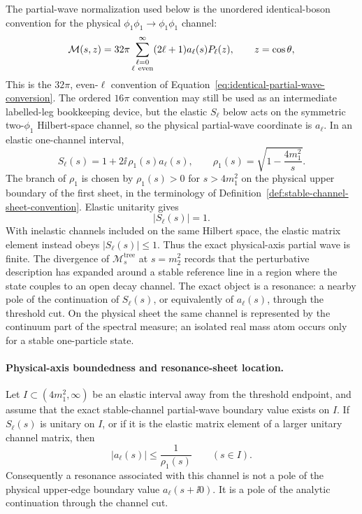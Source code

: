 The partial-wave normalization used below is the unordered identical-boson
convention for the physical \(\phi_1\phi_1\to\phi_1\phi_1\) channel:
\begin{equation}
  \mathcal M(s,z)
  =
  32\pi
  \sum_{\substack{\ell=0\\ \ell\ {\rm even}}}^{\infty}
  (2\ell+1)a_\ell(s)P_\ell(z),
  \qquad z=\cos\theta,
  \label{eq:resonance-partial-wave-expansion}
\end{equation}
This is the \(32\pi\), even-\(\ell\) convention of
Equation~\eqref{eq:identical-partial-wave-conversion}.  The ordered
\(16\pi\) convention may still be used as an intermediate labelled-leg
bookkeeping device, but the elastic \(S_\ell\) below acts on the symmetric
two-\(\phi_1\) Hilbert-space channel, so the physical partial-wave coordinate
is \(a_\ell\).
In an elastic one-channel interval,
\begin{equation}
  S_\ell(s)=1+2\ii\,\rho_1(s)a_\ell(s),
  \qquad
  \rho_1(s)=\sqrt{1-\frac{4m_1^2}{s}} .
  \label{eq:resonance-elastic-s-matrix-normalization}
\end{equation}
The branch of \(\rho_1\) is chosen by \(\rho_1(s)>0\) for \(s>4m_1^2\)
on the physical upper boundary of the first sheet, in the terminology of
Definition~\ref{def:stable-channel-sheet-convention}. Elastic unitarity gives
\begin{equation}
  |S_\ell(s)|=1 .
  \label{eq:resonance-elastic-unitarity}
\end{equation}
With inelastic channels included on the same Hilbert space, the elastic
matrix element instead obeys \(|S_\ell(s)|\le1\). Thus the exact physical-axis
partial wave is finite. The divergence of
\(\mathcal M_s^{\mathrm{tree}}\) at \(s=m_2^2\) records that the perturbative
description has expanded around a stable reference line in a region where the
state couples to an open decay channel. The exact object is a resonance: a
nearby pole of the continuation of \(S_\ell(s)\), or equivalently of
\(a_\ell(s)\), through the threshold cut. On the physical sheet the
same channel is represented by the continuum part of the spectral measure;
an isolated real mass atom occurs only for a stable one-particle state.

\paragraph{Physical-axis boundedness and resonance-sheet location.}
Let \(I\subset(4m_1^2,\infty)\) be an elastic interval away from the threshold
endpoint, and assume that the exact stable-channel partial-wave boundary value
exists on \(I\).  If \(S_\ell(s)\) is unitary on \(I\), or if it is the elastic
matrix element of a larger unitary channel matrix, then
\[
  |a_\ell(s)|
  \le
  \frac{1}{\rho_1(s)}
  \qquad (s\in I).
\]
Consequently a resonance associated with this channel is not a pole of the
physical upper-edge boundary value \(a_\ell(s+\ii0)\).  It is a pole of the
analytic continuation through the channel cut.

